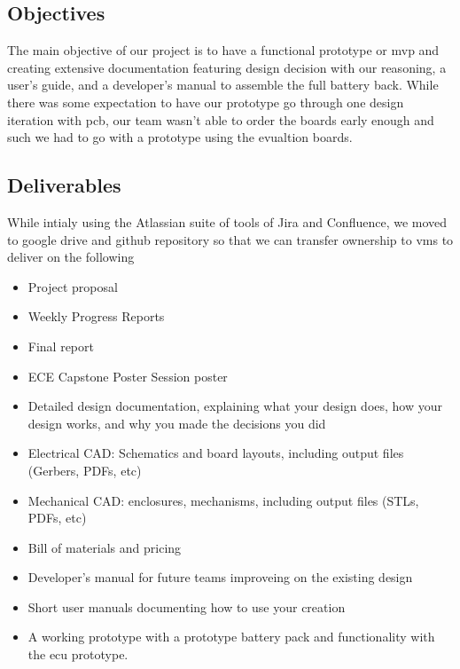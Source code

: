 \subsection{Objectives}

The main objective of our project is to have a functional prototype or \gls{mvp} and creating extensive documentation featuring design decision with our reasoning, a user's guide, and a developer's manual to assemble the full battery back. While there was some expectation to have our prototype go through one design iteration with \gls{pcb}, our team wasn't able to order the boards early enough and such we had to go with a prototype using the evualtion boards.

\subsection{Deliverables}

While intialy using the Atlassian suite of tools of Jira and Confluence, we moved to google drive and github repository so that we can transfer ownership to \gls{vms} to deliver on the following

\begin{itemize}
	\item Project proposal
	\item Weekly Progress Reports
	\item Final report
	\item ECE Capstone Poster Session poster
	\item Detailed design documentation, explaining what your design does, how your design works, and why you made the decisions you did
	\item Electrical CAD: Schematics and board layouts, including output files (Gerbers, PDFs, etc)
	\item Mechanical CAD: enclosures, mechanisms, including output files (STLs, PDFs, etc)
	\item Bill of materials and pricing
	\item Developer's manual for future teams improveing on the existing design
	\item Short user manuals documenting how to use your creation
	\item A working prototype with a prototype battery pack and functionality with the \gls{ecu} prototype.
\end{itemize}